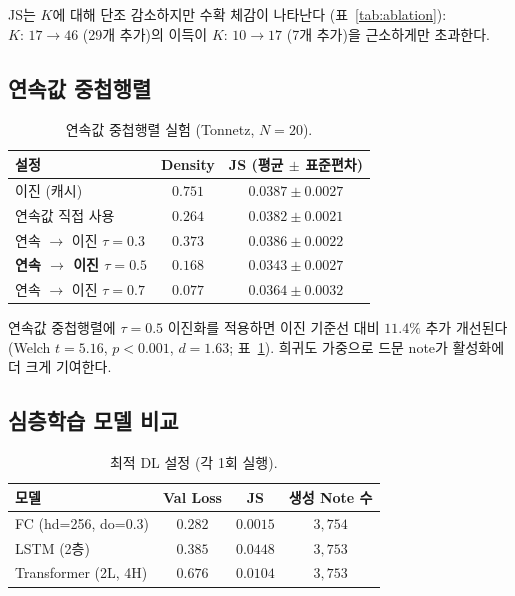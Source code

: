 \documentclass[conference,10pt,a4paper]{IEEEtran}
\begin{document}
JS는 $K$에 대해 단조 감소하지만 수확 체감이 나타난다
(표~\ref{tab:ablation}): $K{:}\,17 \to 46$ (29개 추가)의 이득이
$K{:}\,10 \to 17$ (7개 추가)을 근소하게만 초과한다.

\subsection{연속값 중첩행렬}
\label{subsec:continuous}

\begin{table}[t]
\centering
\caption{연속값 중첩행렬 실험 (Tonnetz, $N=20$).}
\label{tab:continuous}
\begin{tabular}{lcc}
\toprule
설정 & Density & JS (평균 $\pm$ 표준편차) \\
\midrule
이진 (캐시)                & $0.751$ & $0.0387 \pm 0.0027$ \\
연속값 직접 사용            & $0.264$ & $0.0382 \pm 0.0021$ \\
연속 $\to$ 이진 $\tau{=}0.3$ & $0.373$ & $0.0386 \pm 0.0022$ \\
\textbf{연속 $\to$ 이진 $\tau{=}0.5$} & $\mathbf{0.168}$ & $\mathbf{0.0343 \pm 0.0027}$ \\
연속 $\to$ 이진 $\tau{=}0.7$ & $0.077$ & $0.0364 \pm 0.0032$ \\
\bottomrule
\end{tabular}
\end{table}

연속값 중첩행렬에 $\tau = 0.5$ 이진화를 적용하면 이진 기준선 대비
$11.4\%$ 추가 개선된다 (Welch $t = 5.16$, $p < 0.001$, $d = 1.63$;
표~\ref{tab:continuous}).
희귀도 가중으로 드문 note가 활성화에 더 크게 기여한다.

\subsection{심층학습 모델 비교}
\label{subsec:dl}

\begin{table}[t]
\centering
\caption{최적 DL 설정 (각 1회 실행).}
\label{tab:dl}
\begin{tabular}{lccc}
\toprule
모델 & Val Loss & JS & 생성 Note 수 \\
\midrule
FC (hd=256, do=0.3)   & $0.282$ & $\mathbf{0.0015}$ & $3{,}754$ \\
LSTM (2층)              & $0.385$ & $0.0448$ & $3{,}753$ \\
Transformer (2L, 4H)   & $0.676$ & $0.0104$ & $3{,}753$ \\
\bottomrule
\end{tabular}
\end{table}
\end{document}

